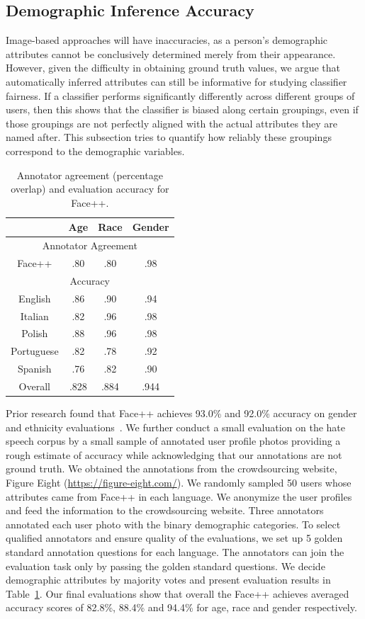 \subsection{Demographic Inference Accuracy}

Image-based approaches will have inaccuracies, as a person's demographic attributes cannot be conclusively determined merely from their appearance. 
However, given the difficulty in obtaining ground truth values, we argue that automatically inferred attributes can still be informative for studying classifier fairness. 
If a classifier performs significantly differently across different groups of users, then this shows that the classifier is biased along certain groupings, even if those groupings are not perfectly aligned with the actual attributes they are named after. 
This subsection tries to quantify how reliably these groupings correspond to the demographic variables.


\begin{table}[th]
\centering
\begin{tabular}{c||c|c|c}
 & Age & Race & Gender \\ \hline
\multicolumn{4}{c}{Annotator Agreement} \\ \hline
Face++ & .80 & .80 & .98 \\ \hline
\multicolumn{4}{c}{Accuracy} \\ \hline
English & .86 & .90 & .94 \\ \hline
Italian & .82 & .96 & .98 \\ \hline
Polish & .88 & .96 & .98 \\ \hline
Portuguese & .82 & .78 & .92 \\ \hline
Spanish & .76 & .82 & .90 \\ \hline
Overall & .828 & .884 & .944 \\ 
\end{tabular}
\caption{Annotator agreement (percentage overlap) and evaluation accuracy for Face++.}
\label{tab:api_eval}
\end{table}

Prior research found that Face++ achieves 93.0\% and 92.0\% accuracy on gender and ethnicity evaluations~\cite{jung2018assessing}.
We further conduct a small evaluation on the hate speech corpus by a small sample of annotated user profile photos providing a rough estimate of accuracy while acknowledging that our annotations are not ground truth.
We obtained the annotations from the crowdsourcing website, Figure Eight (\url{https://figure-eight.com/}).
We randomly sampled 50 users whose attributes came from Face++ in each language.
We anonymize the user profiles and feed the information to the crowdsourcing website.
Three annotators annotated each user photo with the binary demographic categories.
To select qualified annotators and ensure quality of the evaluations, we set up 5 golden standard annotation questions for each language.
The annotators can join the evaluation task only by passing the golden standard questions.
We decide demographic attributes by majority votes and present evaluation results in Table~\ref{tab:api_eval}.
Our final evaluations show that overall the Face++ achieves averaged accuracy scores of 82.8\%, 88.4\% and 94.4\% for age, race and gender respectively.

